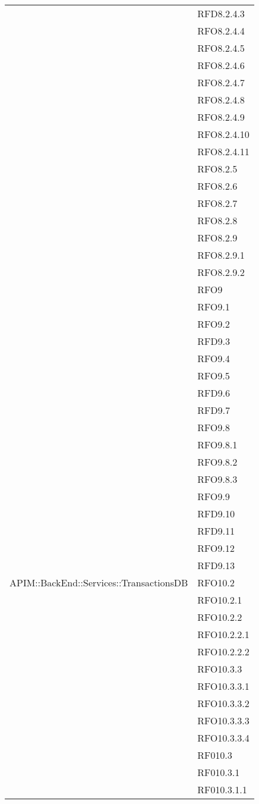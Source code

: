 \begin{longtable}{ p{12cm} | p{4cm} }
	& RFD8.2.4.3 \\
	& RFO8.2.4.4 \\
	& RFO8.2.4.5 \\
	& RFO8.2.4.6 \\
	& RFO8.2.4.7 \\
	& RFO8.2.4.8 \\
	& RFO8.2.4.9 \\
	& RFO8.2.4.10 \\
	& RFO8.2.4.11 \\
	& RFO8.2.5 \\
	& RFO8.2.6 \\
	& RFO8.2.7 \\
	& RFO8.2.8 \\
	& RFO8.2.9 \\
	& RFO8.2.9.1 \\
	& RFO8.2.9.2 \\
	& RFO9 \\
	& RFO9.1 \\
	& RFO9.2 \\
	& RFD9.3 \\
	& RFO9.4 \\
	& RFO9.5 \\
	& RFD9.6 \\
	& RFD9.7 \\
	& RFO9.8 \\
	& RFO9.8.1 \\
	& RFO9.8.2 \\
	& RFO9.8.3 \\
	& RFO9.9 \\
	& RFD9.10 \\
	& RFD9.11 \\
	& RFO9.12 \\
	& RFD9.13 \\
	\hline
	APIM::BackEnd::Services::TransactionsDB
	& RFO10.2 \\
	& RFO10.2.1 \\
	& RFO10.2.2 \\
	& RFO10.2.2.1 \\
	& RFO10.2.2.2 \\
	& RFO10.3.3 \\
	& RFO10.3.3.1 \\
	& RFO10.3.3.2 \\
	& RFO10.3.3.3 \\
	& RFO10.3.3.4 \\
	& RF010.3 \\
	& RF010.3.1 \\
	& RF010.3.1.1 \\

\end{longtable}
